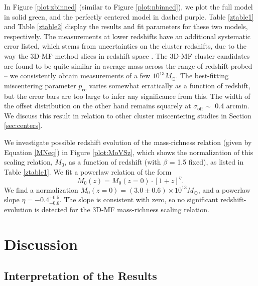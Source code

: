 In Figure \ref{plot:zbinned} (similar to Figure \ref{plot:nbinned}), we plot the full model in solid green, and the perfectly centered model in dashed purple. Table \ref{ztable1} and Table \ref{ztable2} display the results and fit parameters for these two models, respectively. The measurements at lower redshifts have an additional systematic error listed, which stems from uncertainties on the cluster redshifts, due to the way the \ac{3D-MF} method slices in redshift space \citep{Ford14}. The \ac{3D-MF} cluster candidates are found to be quite similar in average mass across the range of redshift probed -- we consistently obtain measurements of a few $10^{13} M_{\odot}$. The best-fitting miscentering parameter $p_{\mathrm{cc}}$ varies somewhat erratically as a function of redshift, but the error bars are too large to infer any significance from this. The width of the offset distribution on the other hand remains squarely at $\sigma_{\mathrm{off}} \sim$ 0.4 arcmin. We discuss this result in relation to other cluster miscentering studies in Section \ref{sec:centers}.

We investigate possible redshift evolution of the mass-richness relation (given by Equation \ref{MNeq}) in Figure \ref{plot:MoVSz}, which shows the normalization of this scaling relation, $M_0$, as a function of redshift (with $\beta$ = 1.5 fixed), as listed in Table \ref{ztable1}. We fit a powerlaw relation of the form
\begin{equation}
\label{MoZeq}
M_0 (z) = M_0 (z=0) \cdot \left[ 1+z \right] ^{\eta}.
\end{equation}
We find a normalization $M_0 (z=0) = (3.0 \pm 0.6) \times 10^{13} M_{\odot}$, and a powerlaw slope $\eta = -0.4^{+0.5}_{-0.6}$. The slope is consistent with zero, so no significant redshift-evolution is detected for the \ac{3D-MF} mass-richness scaling relation.



\section{Discussion}
\label{ch4:disc}


\subsection{Interpretation of the Results}

